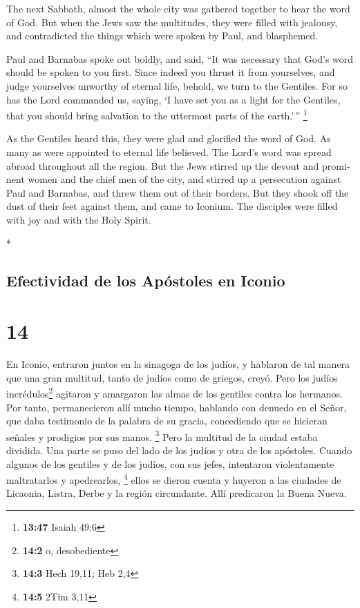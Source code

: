\begin{paracol}{2}
\begin{otherlanguage}{english}
 The next Sabbath, almost the whole city was gathered
together to hear the word of God.  But when the Jews saw
the multitudes, they were filled with jealousy, and contradicted the
things which were spoken by Paul, and blasphemed.

 Paul and Barnabas spoke out boldly, and said, ``It was
necessary that God's word should be spoken to you first. Since indeed
you thrust it from yourselves, and judge yourselves unworthy of eternal
life, behold, we turn to the Gentiles.  For so has the
Lord commanded us, saying, `I have set you as a light for the Gentiles,
that you should bring salvation to the uttermost parts of the
earth.'\,'' \footnote{\textbf{13:47} Isaiah 49:6}

 As the Gentiles heard this, they were glad and glorified
the word of God. As many as were appointed to eternal life believed.
 The Lord's word was spread abroad throughout all the
region.  But the Jews stirred up the devout and prominent
women and the chief men of the city, and stirred up a persecution
against Paul and Barnabas, and threw them out of their borders.
 But they shook off the dust of their feet against them,
and came to Iconium.  The disciples were filled with joy
and with the Holy Spirit.

\end{otherlanguage}

\switchcolumn[0]*

\hypertarget{efectividad-de-los-apuxf3stoles-en-iconio}{%
\subsection{Efectividad de los Apóstoles en
Iconio}\label{efectividad-de-los-apuxf3stoles-en-iconio}}

\hypertarget{section-26}{%
\section{14}\label{section-26}}

 En Iconio, entraron juntos en la sinagoga de los judíos,
y hablaron de tal manera que una gran multitud, tanto de judíos como de
griegos, creyó.  Pero los judíos incrédulos\footnote{\textbf{14:2}
  o, desobediente} agitaron y amargaron las almas de los gentiles contra
los hermanos.  Por tanto, permanecieron allí mucho tiempo,
hablando con denuedo en el Señor, que daba testimonio de la palabra de
su gracia, concediendo que se hicieran señales y prodigios por sus
manos. \footnote{\textbf{14:3} Hech 19,11; Heb 2,4}  Pero
la multitud de la ciudad estaba dividida. Una parte se puso del lado de
los judíos y otra de los apóstoles.  Cuando algunos de los
gentiles y de los judíos, con sus jefes, intentaron violentamente
maltratarlos y apedrearlos, \footnote{\textbf{14:5} 2Tim 3,11}
 ellos se dieron cuenta y huyeron a las ciudades de
Licaonia, Listra, Derbe y la región circundante.  Allí
predicaron la Buena Nueva.


\end{paracol}
